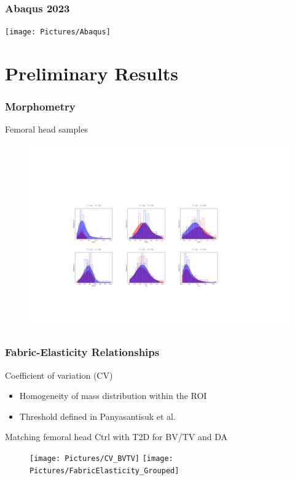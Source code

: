 \documentclass[xcolor=table,11pt]{beamer}
\begin{document}
	\begin{frame}
		\frametitle{Abaqus 2023}
		\texttt{[image: Pictures/Abaqus]}\\
	\end{frame}

	\section{Preliminary Results}

	\begin{frame}
		\frametitle{Morphometry}
		Femoral head samples
		\begin{figure}
			\centering
			\includegraphics[width=\linewidth, trim=100 0 100 0]{Pictures/Morphometry}			
		\end{figure}
	\end{frame}

	\begin{frame}
		\frametitle{Fabric-Elasticity Relationships}
		Coefficient of variation (CV)
		\begin{itemize}
			\item Homogeneity of mass distribution within the ROI
			\item Threshold defined in Panyasantisuk et al. \cite{p1}
		\end{itemize}
		Matching femoral head Ctrl with T2D for BV/TV and DA \cite{p2}
		\begin{figure}
			\centering
			\texttt{[image: Pictures/CV\_BVTV]}
			\texttt{[image: Pictures/FabricElasticity\_Grouped]}
		\end{figure}
	\end{frame}
\end{document}
